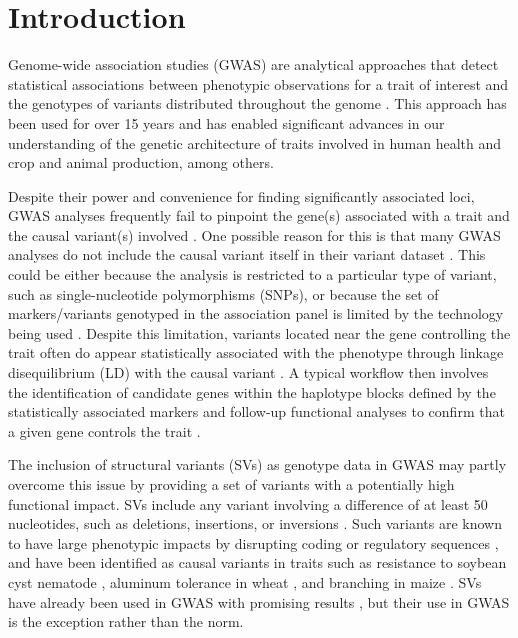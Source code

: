 \section*{Introduction}
\label{sv-gwas-introduction}

Genome-wide association studies (GWAS) are analytical approaches that detect
statistical associations between phenotypic observations for a trait of
interest and the genotypes of variants distributed throughout the
genome \citep{tam2019}. This approach has been used for over 15 years
\citep{visscher2012} and has enabled significant advances in our understanding
of the genetic architecture of traits involved in human health
\citep[e.g.][]{wellcome2007gwas} and crop \citep{tibbs2021} and animal
\citep{ma2019} production, among others.

Despite their power and convenience for finding significantly associated loci,
GWAS analyses frequently fail to pinpoint the gene(s) associated with a trait and
the causal variant(s) involved \citep{tam2019}. One possible reason for this
is that many GWAS analyses do not include the causal variant itself in their variant dataset
\citep{tibbs2021}. This could be either because the analysis
is restricted to a particular type of variant, such as single-nucleotide
polymorphisms (SNPs), or because the set of markers/variants genotyped in the
association panel is limited by the technology being used
\citep[e.g.][]{bandillo2015, sonah2015}. Despite this limitation, variants
located near the gene controlling the trait often do appear statistically
associated with the phenotype through linkage disequilibrium (LD) with the
causal variant \citep{korte2013}.  A typical workflow then involves the
identification of candidate genes within the haplotype blocks defined by the
statistically associated markers and follow-up functional analyses to confirm
that a given gene controls the trait \citep[e.g.][]{wang2018, liu2020ps}.

The inclusion of structural variants (SVs) as genotype data in GWAS may partly overcome
this issue by providing a set of variants with a potentially high functional impact.
SVs include any variant involving a difference of at least 50 nucleotides, such as
deletions, insertions, or inversions \citep{ho2020}. Such variants are known to
have large phenotypic impacts by disrupting coding or regulatory sequences
\citep{marroni2014}, and have been identified as causal variants in traits such
as resistance to soybean cyst nematode \citep{cook2012}, aluminum tolerance in
wheat \citep{maron2013}, and branching in maize \citep{studer2011}.  SVs have
already been used in GWAS with promising results
\citep[e.g.][]{zhang2015, akakpo2020, dominguez2020, liu2020-pangenome}, but
their use in GWAS is the exception rather than the norm.

